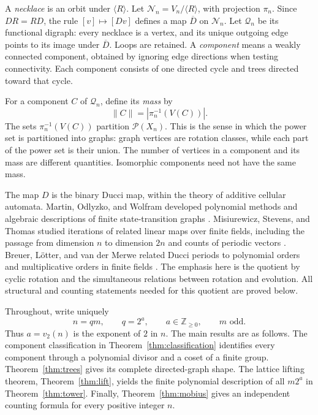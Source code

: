 \documentclass[11pt]{article}
\theoremstyle{definition}
\theoremstyle{remark}
\numberwithin{equation}{section}
\newcommand{\Z}{\mathbb Z}
\newcommand{\Q}{\mathcal Q}
\begin{document}
A \emph{necklace} is an orbit under $\langle R\rangle$. Let
$\mathcal N_n=V_n/\langle R\rangle$, with projection $\pi_n$. Since $DR=RD$,
the rule $[v]\mapsto[Dv]$ defines a map $\overline D$ on $\mathcal N_n$.
Let $\Q_n$ be its functional digraph: every necklace is a vertex, and its
unique outgoing edge points to its image under $\overline D$. Loops are
retained. A \emph{component} means a weakly connected component, obtained by
ignoring edge directions when testing connectivity. Each component consists
of one directed cycle and trees directed toward that cycle.

For a component $C$ of $\Q_n$, define its \emph{mass} by
\begin{equation}\label{eq:mass}
 \lVert C\rVert=|\pi_n^{-1}(V(C))|.
\end{equation}
The sets $\pi_n^{-1}(V(C))$ partition $\mathcal P(X_n)$. This is the sense in
which the power set is partitioned into graphs: graph vertices are rotation
classes, while each part of the power set is their union. The number of
vertices in a component and its mass are different quantities. Isomorphic
components need not have the same mass.

The map $D$ is the binary Ducci map, within the theory of additive cellular
automata. Martin, Odlyzko, and Wolfram developed polynomial methods and
algebraic descriptions of finite state-transition graphs
\cite{MartinOdlyzkoWolfram}. Misiurewicz, Stevens, and Thomas studied
iterations of related linear maps over finite fields, including the passage
from dimension $n$ to dimension $2n$ and counts of periodic vectors
\cite{MisiurewiczStevensThomas}. Breuer, L\"otter, and van der Merwe related
Ducci periods to polynomial orders and multiplicative orders in finite fields
\cite{BreuerLotterMerwe}. The emphasis here is the quotient by cyclic rotation
and the simultaneous relations between rotation and evolution. All structural
and counting statements needed for this quotient are proved below.

Throughout, write uniquely
\begin{equation}\label{eq:decomposition}
 n=qm,\qquad q=2^a,\qquad a\in\Z_{\ge0},\qquad m\text{ odd}.
\end{equation}
Thus $a=v_2(n)$ is the exponent of $2$ in $n$. The main results are as follows.
The component classification in Theorem~\ref{thm:classification} identifies
every component through a polynomial divisor and a coset of a finite group.
Theorem~\ref{thm:trees} gives its complete directed-graph shape.
The lattice lifting theorem, Theorem~\ref{thm:lift}, yields the finite
polynomial description of all $m2^a$ in Theorem~\ref{thm:tower}.
Finally, Theorem~\ref{thm:mobius} gives an independent counting formula for
every positive integer $n$.
\end{document}
